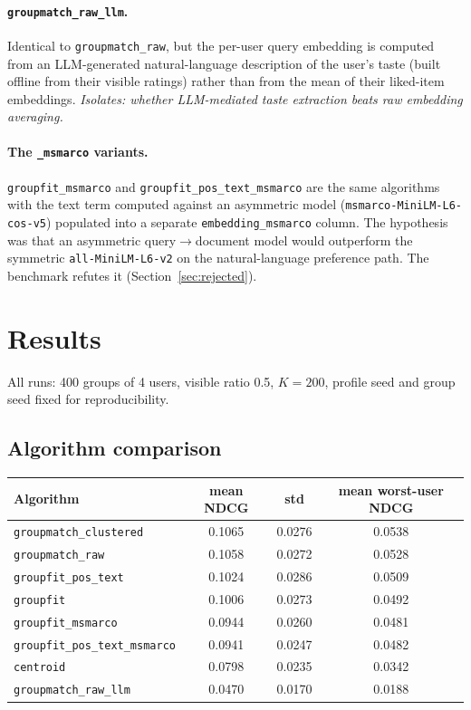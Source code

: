\documentclass[11pt]{article}
\begin{document}
\paragraph{\texttt{groupmatch\_raw\_llm}.}
Identical to \texttt{groupmatch\_raw}, but the per-user query embedding
is computed from an LLM-generated natural-language description of the
user's taste (built offline from their visible ratings) rather than from
the mean of their liked-item embeddings. \emph{Isolates: whether
LLM-mediated taste extraction beats raw embedding averaging.}

\paragraph{The \texttt{\_msmarco} variants.}
\texttt{groupfit\_msmarco} and \texttt{groupfit\_pos\_text\_msmarco} are
the same algorithms with the text term computed against an asymmetric
model (\texttt{msmarco-MiniLM-L6-cos-v5}) populated into a separate
\texttt{embedding\_msmarco} column. The hypothesis was that an
asymmetric query$\to$document model would outperform the symmetric
\texttt{all-MiniLM-L6-v2} on the natural-language preference path. The
benchmark refutes it (Section~\ref{sec:rejected}).

\section{Results}
\label{sec:results}

All runs: 400 groups of 4 users, visible ratio 0.5, $K = 200$, profile
seed and group seed fixed for reproducibility.

\subsection{Algorithm comparison}

\begin{center}
\begin{tabular}{lccc}
\toprule
Algorithm & mean NDCG & std & mean worst-user NDCG \\
\midrule
\texttt{groupmatch\_clustered}      & 0.1065 & 0.0276 & 0.0538 \\
\texttt{groupmatch\_raw}            & 0.1058 & 0.0272 & 0.0528 \\
\texttt{groupfit\_pos\_text}        & 0.1024 & 0.0286 & 0.0509 \\
\texttt{groupfit}                   & 0.1006 & 0.0273 & 0.0492 \\
\texttt{groupfit\_msmarco}          & 0.0944 & 0.0260 & 0.0481 \\
\texttt{groupfit\_pos\_text\_msmarco} & 0.0941 & 0.0247 & 0.0482 \\
\texttt{centroid}                   & 0.0798 & 0.0235 & 0.0342 \\
\texttt{groupmatch\_raw\_llm}       & 0.0470 & 0.0170 & 0.0188 \\
\bottomrule
\end{tabular}
\end{center}
\end{document}
